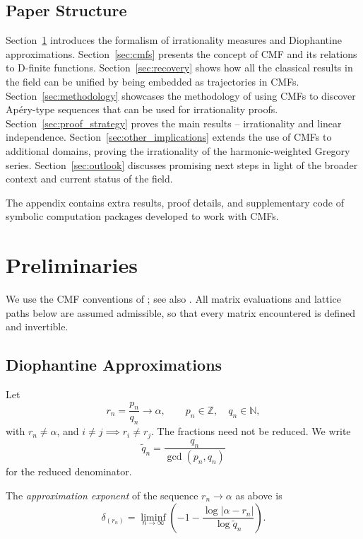 \documentclass[oneside,english,11pt]{amsart}
\begin{document}

\subsection{Paper Structure}

Section~\ref{sec:preliminaries} introduces the formalism of irrationality measures and Diophantine approximations. 
Section~\ref{sec:cmfs} presents the concept of CMF and its relations to D-finite functions.
Section~\ref{sec:recovery} shows how all the classical results in the field can be unified by being embedded as trajectories in CMFs.
Section~\ref{sec:methodology} showcases the methodology of using CMFs to discover Ap\'ery-type sequences that can be used for irrationality proofs.
Section~\ref{sec:proof_strategy} proves the main results -- irrationality and linear independence.
Section~\ref{sec:other_implications} extends the use of CMFs to additional domains, proving the irrationality of the harmonic-weighted Gregory series.
Section~\ref{sec:outlook} discusses promising next steps in light of the broader context and current status of the field.

The appendix contains extra results, proof details, and supplementary code of symbolic computation packages developed to work with CMFs.

\section{Preliminaries}
\label{sec:preliminaries}

We use the CMF conventions of \cite{weinbaum2025conservative}; see also
\cite[Appendices~E and~G]{raz2025euler}.  All matrix evaluations and
lattice paths below are assumed admissible, so that every matrix
encountered is defined and invertible.

\subsection{Diophantine Approximations}
\label{subsec:diophantine-approximation}

Let
\[
    r_n=\frac{p_n}{q_n}\longrightarrow\alpha,
    \qquad
    p_n\in\mathbb Z,\quad q_n\in\mathbb N,
\]
with $r_n\ne\alpha$, and $i\neq j \implies r_i\neq r_j$.  The fractions need not be reduced.  We write
\[
    \widetilde q_n=\frac{q_n}{\gcd(p_n,q_n)}
\]
for the reduced denominator.

\begin{defn}
\label{def:delta}
The \emph{approximation exponent} of the sequence $r_n\to\alpha$ as above is
\[
    \delta_{(r_n)}
    =
    \liminf_{n\to\infty}
    \left(
        -1-\frac{\log|\alpha-r_n|}{\log\widetilde q_n}
    \right).
\]
\end{defn}
\end{document}
